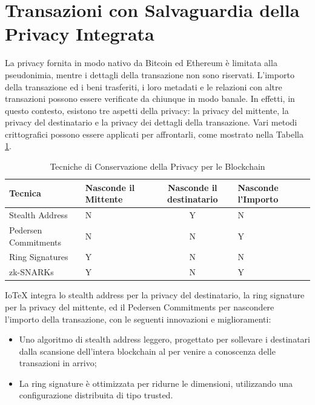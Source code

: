 \section{Transazioni con Salvaguardia della Privacy Integrata}
La privacy fornita in modo nativo da Bitcoin ed Ethereum è limitata alla pseudonimia, mentre i dettagli della transazione non sono riservati. L'importo della transazione ed i beni trasferiti, i loro metadati e le relazioni con altre transazioni possono essere  verificate da chiunque in modo banale. In effetti, in questo contesto, esistono tre aspetti della privacy: la privacy del mittente, la privacy del destinatario e la privacy dei dettagli della transazione. Vari metodi crittografici possono essere applicati per affrontarli, come mostrato nella Tabella \ref{table:PrivacyPreservingTechniques}.

\begin{table}[tp]%
	\caption{Tecniche di Conservazione della Privacy per le Blockchain}
	\label{table:PrivacyPreservingTechniques}\centering %
	\begin{tabular}{l|p{2cm}c|p{2.5cm}|p{2cm}}
		\hline
		Tecnica              & Nasconde il Mittente & Nasconde il destinatario & Nasconde l'Importo \\
		\hline
		Stealth Address      & N                    & Y                        & N                  \\
		Pedersen Commitments & N                    & N                        & Y                  \\
		Ring Signatures      & Y                    & N                        & N                  \\
		zk-SNARKs            & Y                    & N                        & Y                  \\
		\hline
	\end{tabular}
\end{table}

IoTeX integra lo stealth address per la privacy del destinatario, la ring signature per la privacy del mittente, ed il Pedersen Commitments per nascondere l'importo della transazione, con le seguenti innovazioni e miglioramenti:

\begin{itemize}
	\item Uno algoritmo di stealth address leggero, progettato per sollevare i destinatari dalla scansione dell'intera blockchain al per venire a conoscenza delle transazioni in arrivo;

	\item La ring signature è ottimizzata per ridurne le dimensioni, utilizzando una configurazione distribuita di tipo trusted.
\end{itemize}


